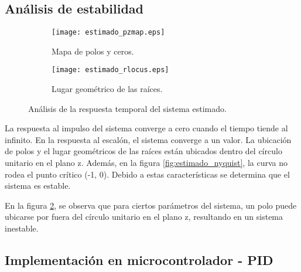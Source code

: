 \vspace{-0.5cm}
\subsection{\textbf{Análisis de estabilidad}}
\vspace{-0.5cm}

\begin{figure}[H]
    \centering

    \begin{subfigure}[b]{0.49\textwidth}
        \centering
        \texttt{[image: estimado\_pzmap.eps]}
        \caption{Mapa de polos y ceros.}
        \label{fig:estimado_pzmap}
    \end{subfigure}
    \begin{subfigure}[b]{0.49\textwidth}
        \centering
        \texttt{[image: estimado\_rlocus.eps]}
        \caption{Lugar geométrico de las raíces.}
        \label{fig:estimado_rlocus}
    \end{subfigure}

    \vspace{-0.25cm}
    \caption{Análisis de la respuesta temporal del sistema estimado.}
    \label{fig:estimado_estabilidad}
\end{figure}
\vspace{-0.5cm}

La respuesta al impulso del sistema converge a cero cuando el tiempo tiende al infinito.
En la respuesta al escalón, el sistema converge a un valor.
La ubicación de polos y el lugar geométricos de las raíces están ubicados dentro 
del círculo unitario en el plano z. Además, en la figura \ref{fig:estimado_nyquist}, la curva no rodea
el punto crítico (-1, 0). Debido a estas características se determina que el sistema es estable.

En la figura \ref{fig:estimado_rlocus}, se observa que para ciertos parámetros del sistema, un polo puede
ubicarse por fuera del círculo unitario en el plano z, resultando en un sistema inestable.

\vspace{-0.5cm}
\subsection{\textbf{Implementación en microcontrolador - PID}}
\vspace{-0.5cm}

